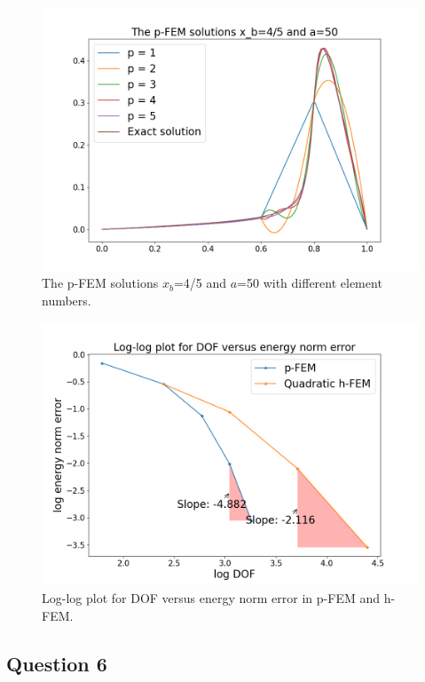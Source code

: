 \documentclass[twoside,twocolumn,10pt]{article}
\begin{document}
\begin{figure}[!ht]
  \centering
  \includegraphics[width=1.\linewidth]{Q1/Q1_5.png}
  \caption{The p-FEM solutions $x_b$=4/5 and $a$=50 with different element numbers.}
  \label{fig:p_5}
\end{figure}

\begin{figure}[!ht]
  \centering
  \includegraphics[width=1.\linewidth]{Q1/h_p_error_5.png}
  \caption{Log-log plot for DOF versus energy norm error in p-FEM and h-FEM.}
  \label{fig:h_p_error_5}
\end{figure}

\subsection{Question 6}
\end{document}
